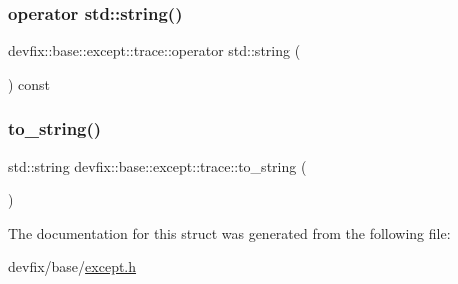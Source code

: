 \subsubsection{\texorpdfstring{operator std\+::string()}{operator std::string()}}
{\footnotesize\ttfamily devfix\+::base\+::except\+::trace\+::operator std\+::string (\begin{DoxyParamCaption}{ }\end{DoxyParamCaption}) const\hspace{0.3cm}{\ttfamily [inline]}}

\mbox{\label{structdevfix_1_1base_1_1except_1_1trace_a8adac52a0781afcb7a399fb6b743f115}} 
\subsubsection{\texorpdfstring{to\+\_\+string()}{to\_string()}}
{\footnotesize\ttfamily std\+::string devfix\+::base\+::except\+::trace\+::to\+\_\+string (\begin{DoxyParamCaption}{ }\end{DoxyParamCaption})\hspace{0.3cm}{\ttfamily [inline]}}



The documentation for this struct was generated from the following file\+:\begin{DoxyCompactItemize}
\item 
devfix/base/\hyperlink{except_8h}{except.\+h}\end{DoxyCompactItemize}
